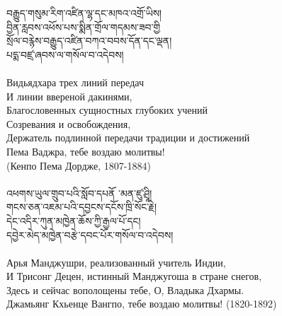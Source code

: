 {\ti བརྒྱུད་གསུམ་རིག་འཛིན་ལྷ་དང་མཁའ་འགྲོ་ཡིས། \\
བྱིན་རླབས་འཕོས་པས་སྨིན་གྲོལ་གདམས་ཟབ་གྱི \\
སྲོལ་བརྙེས་བརྒྱུད་འཛིན་བཀའ་བབས་དོན་དང་ལྡན། \\
པདྨ་བཛྲ་ཞབས་ལ་གསོལ་བ་འདེབས།}\\
\\
\ru
Видьядхара трех линий передач\\ И линии ввереной дакинями,\\
Благословенных сущностных глубоких учений \\Созревания и освобождения,\\
Держатель подлинной передачи традиции и достижений\\
Пема Ваджра, тебе воздаю молитвы! \\
\hspace{1cm} (Кенпо Пема Дордже, 1807-1884)\\
\\

{\ti འཕགས་ཡུལ་གྲུབ་པའི་སློབ་དཔནོ ་མན་ཛུ་ཤྲཱི། \\
གངས་ཅན་འཇམ་པའི་དབྱངས་དངོས་ཁྲི་སོང་རྗེ། \\
དེང་འདིར་ཀུན་མཁྱེན་ཆོས་ཀྱི་རྒྱལ་པོ་དང། \\
དབྱེར་མེད་མཁྱེན་བརྩེ་དབང་པོར་གསོལ་བ་འདེབས།}\\
\\
\ru
Арья Манджушри, реализованный учитель Индии,\\
И Трисонг Децен, истинный Манджугоша в стране снегов,\\
Здесь и сейчас вополощены тебе, О, Владыка Дхармы. \\
Джамьянг Кхьенце Вангпо, тебе воздаю молитвы! (1820-1892)\\
\\
\newpage




